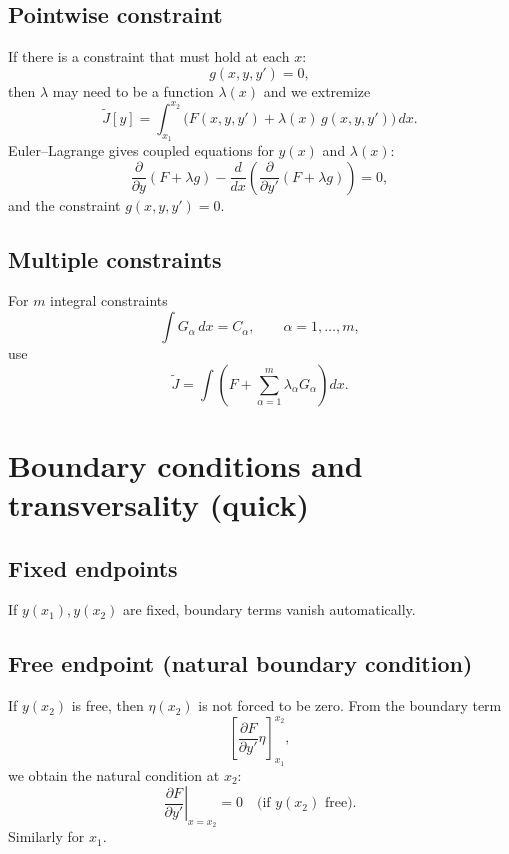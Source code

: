 \subsection{Pointwise constraint}
If there is a constraint that must hold at each $x$:
\begin{equation}
g(x,y,y')=0,
\end{equation}
then $\lambda$ may need to be a function $\lambda(x)$ and we extremize
\begin{equation}
\tilde J[y]=\int_{x_1}^{x_2}\Big(F(x,y,y')+\lambda(x)\,g(x,y,y')\Big)\,dx.
\end{equation}
Euler--Lagrange gives coupled equations for $y(x)$ and $\lambda(x)$:
\begin{equation}
\frac{\partial}{\partial y}(F+\lambda g)
-\frac{d}{dx}\left(\frac{\partial}{\partial y'}(F+\lambda g)\right)=0,
\end{equation}
and the constraint $g(x,y,y')=0$.

\subsection{Multiple constraints}
For $m$ integral constraints
\[
\int G_\alpha\,dx=C_\alpha,\qquad \alpha=1,\dots,m,
\]
use
\begin{equation}
\tilde J=\int\left(F+\sum_{\alpha=1}^m\lambda_\alpha G_\alpha\right)dx.
\end{equation}


\section{Boundary conditions and transversality (quick)}

\subsection{Fixed endpoints}
If $y(x_1),y(x_2)$ are fixed, boundary terms vanish automatically.

\subsection{Free endpoint (natural boundary condition)}
If $y(x_2)$ is free, then $\eta(x_2)$ is not forced to be zero.
From the boundary term
\[
\left[\frac{\partial F}{\partial y'}\eta\right]_{x_1}^{x_2},
\]
we obtain the natural condition at $x_2$:
\begin{equation}
\boxed{
\left.\frac{\partial F}{\partial y'}\right|_{x=x_2}=0
\quad \text{(if }y(x_2)\text{ free)}.
}
\end{equation}
Similarly for $x_1$.

